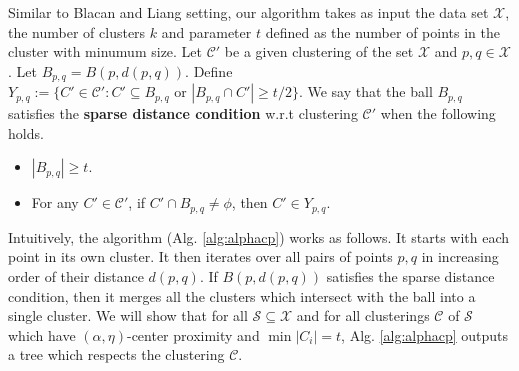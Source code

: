 \documentclass[11pt]{article}
\newcommand{\mc}{\mathcal}
\begin{document}
Similar to Blacan and Liang setting, our algorithm takes as input the data set $\mc X$, the number of clusters $k$ and parameter $t$ defined as the number of points in the cluster with minumum size. Let $\mc C'$ be a given clustering of the set $\mc X$ and $p, q \in \mc X$. Let $B_{p,q} = B(p, d(p, q))$. Define $Y_{p,q} := \{C' \in \mc C' : C' \subseteq B_{p,q} \text{ or } |B_{p,q} \cap C'| \ge t/2\}$. 
We say that the ball $B_{p,q}$ satisfies the \textbf{sparse distance condition} w.r.t clustering $\mc C'$ when the following holds.
\begin{itemize}[noitemsep, leftmargin=*]
\item $|B_{p,q}| \ge t$.
\item For any $C' \in \mc C'$, %
if $C' \cap B_{p,q} \neq \phi$, then $C' \in Y_{p,q}$.
\end{itemize}

Intuitively, the algorithm (Alg. \ref{alg:alphacp}) works as follows. It starts with each point in its own cluster. It then iterates over all pairs of points $p, q$ in increasing order of their distance $d(p, q)$. If $B(p, d(p,q))$ satisfies the sparse distance condition, then it merges all the clusters which intersect with the ball into a single cluster. We will show that for all $\mc S \subseteq \mc X$ and for all clusterings $\mc C$ of $\mc S$ which have $(\alpha, \eta)$-center proximity and $\min |C_i| = t$, Alg. \ref{alg:alphacp} outputs a tree which respects the clustering $\mc C$.
\end{document}
